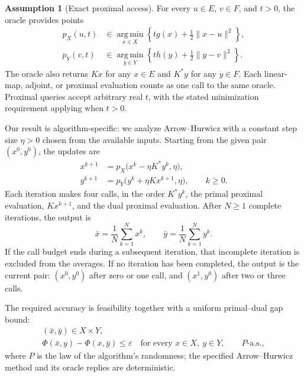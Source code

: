 \documentclass[10pt]{article}
\theoremstyle{definition}
\newtheorem{assumption}{Assumption}
\begin{document}
\begin{assumption}[Exact proximal access]
For every $u\in E$, $v\in F$, and $t>0$, the oracle provides points
\[
\begin{aligned}
p_X(u,t)&\in\operatorname*{arg\,min}_{x\in X}
\left\{t g(x)+\tfrac12\|x-u\|^2\right\},\\
p_Y(v,t)&\in\operatorname*{arg\,min}_{y\in Y}
\left\{t h(y)+\tfrac12\|y-v\|^2\right\}.
\end{aligned}
\]
The oracle also returns $Kx$ for any $x\in E$ and $K^*y$ for any $y\in F$. Each linear-map, adjoint, or proximal evaluation counts as one call to the same oracle. Proximal queries accept arbitrary real $t$, with the stated minimization requirement applying when $t>0$.
\end{assumption}

Our result is algorithm-specific: we analyze Arrow--Hurwicz with a constant step size $\eta>0$ chosen from the available inputs. Starting from the given pair $(x^0,y^0)$, the updates are
\[
\begin{aligned}
x^{k+1}&=p_X\bigl(x^k-\eta K^*y^k,\eta\bigr),\\
y^{k+1}&=p_Y\bigl(y^k+\eta Kx^{k+1},\eta\bigr),
\qquad k\geq0.
\end{aligned}
\]
Each iteration makes four calls, in the order $K^*y^k$, the primal proximal evaluation, $Kx^{k+1}$, and the dual proximal evaluation. After $N\geq1$ complete iterations, the output is
\[
\bar{x}=\frac1N\sum_{k=1}^{N}x^k,
\qquad
\bar{y}=\frac1N\sum_{k=1}^{N}y^k.
\]
If the call budget ends during a subsequent iteration, that incomplete iteration is excluded from the averages. If no iteration has been completed, the output is the current pair: $(x^0,y^0)$ after zero or one call, and $(x^1,y^0)$ after two or three calls.

The required accuracy is feasibility together with a uniform primal--dual gap bound:
\[
\begin{gathered}
(\bar{x},\bar{y})\in X\times Y,\\
\Phi(\bar{x},y)-\Phi(x,\bar{y})\leq\varepsilon
\quad\text{for every }x\in X,\ y\in Y,
\qquad P\text{-a.s.},
\end{gathered}
\]
where $P$ is the law of the algorithm's randomness; the specified Arrow--Hurwicz method and its oracle replies are deterministic.
\end{document}
